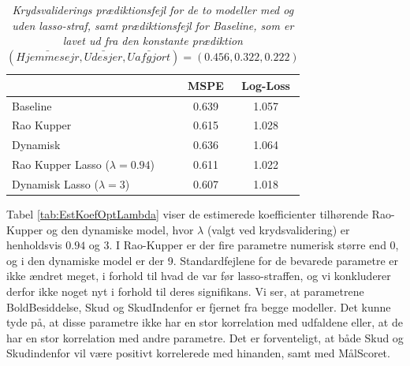 \documentclass[11pt,a4paper]{article}
\begin{document}
\begin{table}[ht]
\centering
\begin{adjustbox}{max width=\textwidth}
\begin{tabular}{|l|cc|}
\hline 
 & MSPE & Log-Loss  \\
 \hline
Baseline & 0.639 & 1.057 \\
Rao Kupper & 0.615 & 1.028 \\
Dynamisk & 0.636 & 1.064 \\
Rao Kupper Lasso ($\lambda=0.94$)& 0.611 & 1.022 \\
Dynamisk Lasso ($\lambda=3$) & 0.607 & 1.018 \\
   \hline   
\end{tabular} 
\end{adjustbox}
\caption{\label{tab:KVMSPELOGLOSS}\textit{Krydsvaliderings prædiktionsfejl for de to modeller med og uden lasso-straf, samt prædiktionsfejl for Baseline, som er lavet ud fra den konstante prædiktion $(\bar{Hjemmesejr},\bar{Udesjer}, \bar{Uafgjort}) = (0.456,0.322,0.222)$}}
\end{table}
\newpage
Tabel \ref{tab:EstKoefOptLambda} viser de estimerede koefficienter tilhørende Rao-Kupper og den dynamiske model, hvor $\lambda$ (valgt ved krydsvalidering) er henholdsvis $0.94$ og $3$. I Rao-Kupper er der fire  parametre numerisk større end 0, og i den dynamiske model er der 9. Standardfejlene for de bevarede parametre er ikke ændret meget, i forhold til hvad de var før lasso-straffen, og vi konkluderer derfor ikke noget nyt i forhold til deres signifikans. Vi ser, at parametrene BoldBesiddelse, Skud og SkudIndenfor er fjernet fra begge modeller. Det kunne tyde på, at disse parametre ikke har en stor korrelation med udfaldene eller, at de har en stor korrelation med andre parametre. Det er forventeligt, at både Skud og Skudindenfor vil være positivt korrelerede med hinanden, samt med MålScoret. \\
\end{document}
